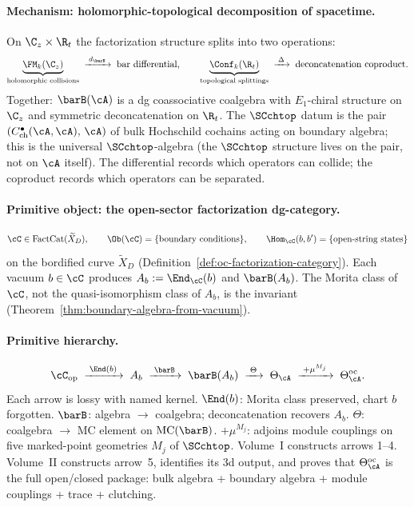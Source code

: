 \paragraph{Mechanism: holomorphic-topological decomposition of
spacetime.}
On $\C_z \times \R_t$ the factorization structure splits into
two operations:
\[
 \underbrace{\FM_k(\C_z)}_{\text{holomorphic collisions}}
 \;\xrightarrow{\;d_{\barB}\;}\;
 \text{bar differential},
 \qquad
 \underbrace{\Conf_k(\R_t)}_{\text{topological splittings}}
 \;\xrightarrow{\;\Delta\;}\;
 \text{deconcatenation coproduct}.
\]
Together: $\barB(\cA)$ is a dg coassociative coalgebra with
$E_1$-chiral structure on $\C_z$ and symmetric deconcatenation
on $\R_t$. The $\SCchtop$ datum is the pair
$(C^\bullet_{\mathrm{ch}}(\cA, \cA),\, \cA)$ of bulk Hochschild
cochains acting on boundary algebra; this is the universal
$\SCchtop$-algebra (the $\SCchtop$ structure lives on the pair,
not on $\cA$ itself). The differential records which
operators can collide; the coproduct records which operators
can be separated.

\paragraph{Primitive object: the open-sector factorization
dg-category.}
\[
 \cC \in \mathrm{FactCat}(\widetilde{X}_D),
 \qquad
 \Ob(\cC) = \{\text{boundary conditions}\},
 \qquad
 \Hom_\cC(b, b') = \{\text{open-string states}\}
\]
on the bordified curve $\widetilde{X}_D$
(Definition~\ref{def:oc-factorization-category}).
Each vacuum $b \in \cC$ produces $A_b := \End_\cC(b)$ and
$\barB(A_b)$. The Morita class of $\cC$, not the
quasi-isomorphism class of $A_b$, is the invariant
(Theorem~\ref{thm:boundary-algebra-from-vacuum}).

\paragraph{Primitive hierarchy.}
\[
\cC_{\mathrm{op}}
\;\xrightarrow{\;\End(b)\;}\;
A_b
\;\xrightarrow{\;\barB\;}\;
\barB(A_b)
\;\xrightarrow{\;\Theta\;}\;
\Theta_\cA
\;\xrightarrow{\;+\mu^{M_j}\;}\;
\Theta^{\mathrm{oc}}_\cA.
\]
Each arrow is lossy with named kernel.
$\End(b)$: Morita class preserved, chart $b$ forgotten.
$\barB$: algebra $\to$ coalgebra; deconcatenation recovers $A_b$.
$\Theta$: coalgebra $\to$ MC element on $\mathrm{MC}(\barB)$.
$+\mu^{M_j}$: adjoins module couplings on five marked-point
geometries $M_j$ of $\SCchtop$.
Volume~I constructs arrows 1--4. Volume~II constructs arrow~5,
identifies its 3d output, and proves that
$\Theta^{\mathrm{oc}}_\cA$ is the full open/closed package: bulk
algebra + boundary algebra + module couplings + trace + clutching.

